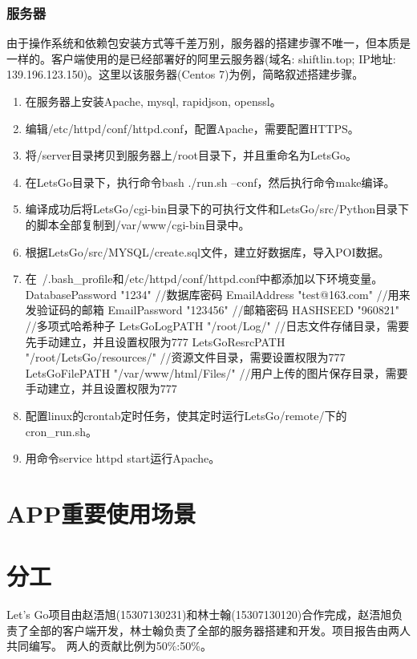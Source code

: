 \documentclass[UTF8]{article}
\begin{document}
\subsubsection{服务器}
由于操作系统和依赖包安装方式等千差万别，服务器的搭建步骤不唯一，但本质是一样的。客户端使用的是已经部署好的阿里云服务器(域名: shiftlin.top; IP地址: 139.196.123.150)。这里以该服务器(Centos 7)为例，简略叙述搭建步骤。
\begin{enumerate}
    \item 在服务器上安装Apache, mysql, rapidjson, openssl。
    \item 编辑/etc/httpd/conf/httpd.conf，配置Apache，需要配置HTTPS。
    \item 将/server目录拷贝到服务器上/root目录下，并且重命名为LetsGo。
    \item 在LetsGo目录下，执行命令bash ./run.sh --conf，然后执行命令make编译。
    \item 编译成功后将LetsGo/cgi-bin目录下的可执行文件和LetsGo/src/Python目录下的脚本全部复制到/var/www/cgi-bin目录中。
    \item 根据LetsGo/src/MYSQL/create.sql文件，建立好数据库，导入POI数据。
    \item 在~/.bash_profile和/etc/httpd/conf/httpd.conf中都添加以下环境变量。\\
    DatabasePassword "1234" //数据库密码 
    EmailAddress "test@163.com" //用来发验证码的邮箱
    EmailPassword "123456" //邮箱密码
    HASHSEED "960821" //多项式哈希种子
    LetsGoLogPATH "/root/Log/" //日志文件存储目录，需要先手动建立，并且设置权限为777
    LetsGoResrcPATH "/root/LetsGo/resources/" //资源文件目录，需要设置权限为777
    LetsGoFilePATH "/var/www/html/Files/" //用户上传的图片保存目录，需要手动建立，并且设置权限为777
    \item 配置linux的crontab定时任务，使其定时运行LetsGo/remote/下的cron_run.sh。
    \item 用命令service httpd start运行Apache。
\end{enumerate}

\section{APP重要使用场景}



\section{分工}
Let's Go项目由赵浯旭(15307130231)和林士翰(15307130120)合作完成，赵浯旭负责了全部的客户端开发，林士翰负责了全部的服务器搭建和开发。项目报告由两人共同编写。
两人的贡献比例为50\%:50\%。
\end{document}
